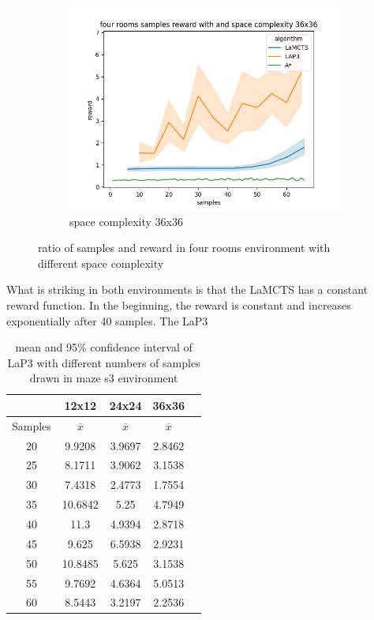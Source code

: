 \documentclass[bibliography=totoc]{scrartcl}
\begin{document}
\begin{figure}[H]
	\begin{subfigure}[b]{0.3\linewidth}
		\includegraphics[width=\linewidth]{img/four_rooms_samples__reward_b_8_LAP3_MCTS_AStar_interrupted_36.png}
        \caption{space complexity 36x36}
	\end{subfigure}
	\caption{ratio of samples and reward in four rooms environment with different space complexity}
	\label{fig:SampleRewardFourRoomsDifferentSpaceComplexity}
\end{figure}

What is striking in both environments is that the \ac{LaMCTS} has a constant reward function. In the beginning, the reward is constant and increases exponentially after 40 samples.
The \ac{LaP3}

\begin{table}[H]
\centering
\begin{tabular}{|c|c|c|c|c|}
\hline
& {12x12} & {24x24} & {36x36} \\ \hline
Samples & $\overline{x}$ & $\overline{x}$ &  $\overline{x}$ \\ \hline
20 & 9.9208     & 3.9697  & 2.8462 \\ \hline
25 & 8.1711     & 3.9062  & 3.1538 \\ \hline
30 & 7.4318     & 2.4773  & 1.7554 \\ \hline
35 & 10.6842    & 5.25    & 4.7949 \\ \hline
40 & 11.3       & 4.9394  & 2.8718 \\ \hline
45 & 9.625      & 6.5938  & 2.9231 \\ \hline
50 & 10.8485    & 5.625   & 3.1538 \\ \hline
55 & 9.7692     & 4.6364  & 5.0513 \\ \hline
60 & 8.5443     & 3.2197  & 2.2536 \\ \hline
\end{tabular}
\caption{mean and 95\% confidence interval of \ac{LaP3} with different numbers of samples drawn in maze s3 environment}
\label{tab:mean_std_diff_sizes}
\end{table}
\end{document}
